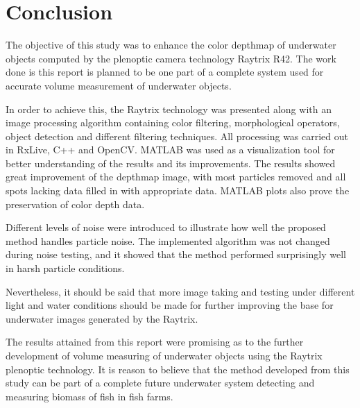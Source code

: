 \section{Conclusion}\label{conclusion}

The objective of this study was to enhance the color depthmap of underwater objects computed by the plenoptic camera technology Raytrix R42. The work done is this report is planned to be one part of a complete system used for accurate volume measurement of underwater objects. 

In order to achieve this, the Raytrix technology was presented along with an image processing algorithm containing color filtering, morphological operators, object detection and different filtering techniques. All processing was carried out in RxLive, C++ and OpenCV. MATLAB was used as a visualization tool for better understanding of the results and its improvements. The results showed great improvement of the depthmap image, with most particles removed and all spots lacking data filled in with appropriate data. MATLAB plots also prove the preservation of color depth data.

Different levels of noise were introduced to illustrate how well the proposed method handles particle noise. The implemented algorithm was not changed during noise testing, and it showed that the method performed surprisingly well in harsh particle conditions. 

Nevertheless, it should be said that more image taking and testing under different light and water conditions should be made for further improving the base for underwater images generated by the Raytrix.

The results attained from this report were promising as to the further development of volume measuring of underwater objects using the Raytrix plenoptic technology. It is reason to believe that the method developed from this study can be part of a complete future underwater system detecting and measuring biomass of fish in fish farms. 

